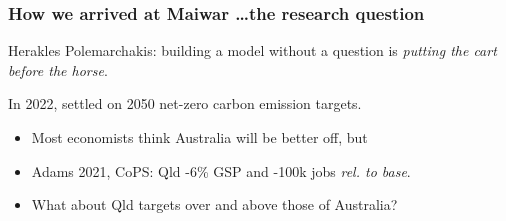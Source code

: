 \documentclass[handout,english]{beamer}
\begin{document}
\begin{frame}
  \frametitle{How we arrived at Maiwar \dots the research question}
  Herakles Polemarchakis: building a model without a question is 
  \emph{putting the cart before the horse}.

  In 2022, settled on 2050 net-zero carbon emission targets.
    \begin{itemize}
      \item Most economists think Australia will be better off, but
      \item Adams 2021, CoPS: Qld -6\% GSP and -100k jobs \emph{rel. to base}.
      \item What about Qld targets over and above those of Australia?
    \end{itemize}
\end{frame}
\end{document}
